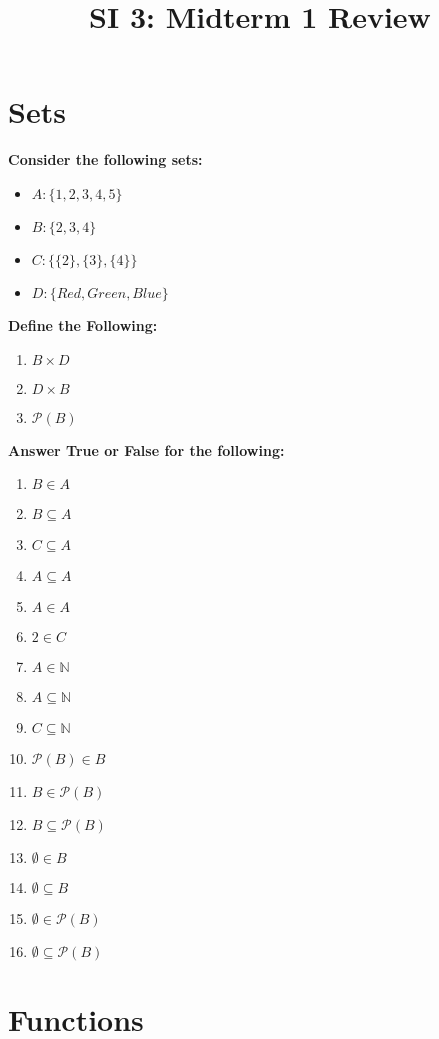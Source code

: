 \documentclass[12pt]{article}
\date{}
\author{}
\title{SI 3: Midterm 1 Review}
\begin{document}
\maketitle
\section{Sets}
\textbf{Consider the following sets:}
\begin{itemize}
\item $A: \{1,2,3,4,5\}$
\item $B: \{2,3,4\}$
\item $C: \{\{2\},\{3\},\{4\}\}$
\item $D: \{Red, Green, Blue\}$
\end{itemize}
\textbf{Define the Following:}
\begin{enumerate}
\item$B\times D$
\item$D\times B$
\item $ \mathcal{P}(B)$
\end{enumerate}
\textbf{Answer True or False for the following:}
\begin{enumerate}
\item$B\in A$
\item$B\subseteq A$
\item$C\subseteq A$
\item$A\subseteq A$
\item$A\in A$
\item$2\in C$
\item$A\in \mathbb{N}$
\item$A \subseteq \mathbb{N}$
\item$C \subseteq \mathbb{N}$
\item$\mathcal{P}(B)\in B$
\item$B \in \mathcal{P}(B)$
\item$B\subseteq\mathcal{P}(B)$
\item$\emptyset \in B$
\item$\emptyset \subseteq B$
\item$\emptyset \in \mathcal{P}(B)$
\item$\emptyset \subseteq \mathcal{P}(B)$
\end{enumerate}
\newpage
\section{Functions}
\end{document}
